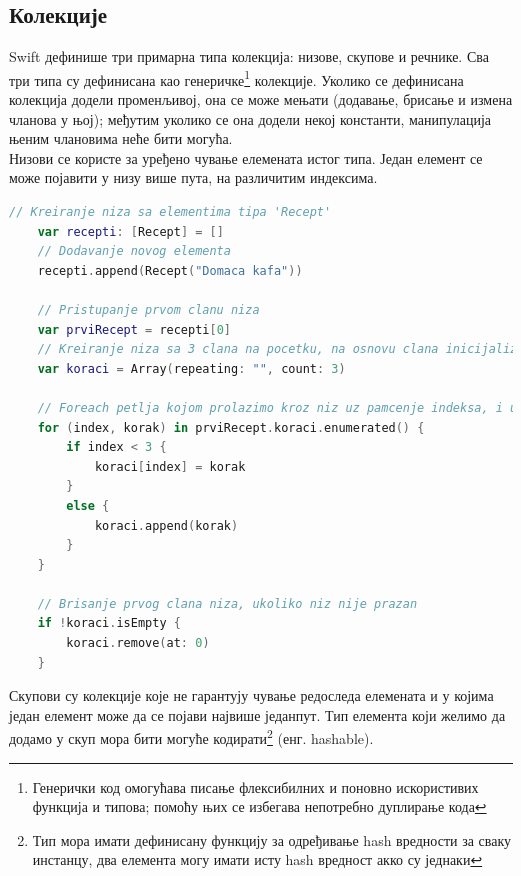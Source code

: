 \documentclass[12pt,oneside]{memoir}
\begin{document}
\subsection{Колекције}
\label{subsec:Колекције}

\indent Swift дефинише три примарна типа колекција: низове, скупове и речнике. Сва три типа су дефинисана као генеричке\footnote{Генерички код омогућава писање флексибилних и поновно искористивих функција и типова; помоћу њих се избегава непотребно дуплирање кода} колекције. Уколико се дефинисана колекција додели променљивој, она се може мењати (додавање, брисање и измена чланова у њој); међутим уколико се она додели некој константи, манипулација њеним члановима неће бити могућа. \\

\indent Низови се користе за уређено чување елемената истог типа. Један елемент се може појавити у низу више пута, на различитим индексима. 

\begin{lstlisting}[caption=\textit{{Рад са низовима}}, label={lst:Рад са низовима}, language=Swift, frame=single]
    // Kreiranje niza sa elementima tipa 'Recept'
    var recepti: [Recept] = []
    // Dodavanje novog elementa
    recepti.append(Recept("Domaca kafa"))
    
    // Pristupanje prvom clanu niza
    var prviRecept = recepti[0]
    // Kreiranje niza sa 3 clana na pocetku, na osnovu clana inicijalizacije se zakljucuje da ce elementi biti tipa 'String'
    var koraci = Array(repeating: "", count: 3)
    
    // Foreach petlja kojom prolazimo kroz niz uz pamcenje indeksa, i ukoliko trenutni indeks postoji u nizu, menjamo element na tom indeksu, u suprotnom dodajemo novi element
    for (index, korak) in prviRecept.koraci.enumerated() {
        if index < 3 {
            koraci[index] = korak
        }
        else {
            koraci.append(korak)
        }
    }
    
    // Brisanje prvog clana niza, ukoliko niz nije prazan
    if !koraci.isEmpty {
        koraci.remove(at: 0)
    }
\end{lstlisting}

\indent Скупови су колекције које не гарантују чување редоследа елемената и у којима један елемент може да се појави највише једанпут. Тип елемента који желимо да додамо у скуп мора бити могуће кодирати\footnote{Тип мора имати дефинисану функцију за одређивање hash вредности за сваку инстанцу, два елемента могу имати исту hash вредност акко су једнаки} (енг. hashable).
\end{document}
